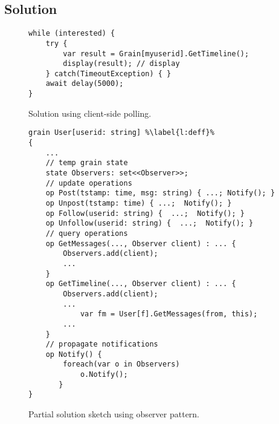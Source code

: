 \subsection{Solution}


 
\begin{figure}
\begin{lstlisting}
while (interested) {
	try {
		var result = Grain[myuserid].GetTimeline();
		display(result); // display
	} catch(TimeoutException) { }
	await delay(5000);
}
\end{lstlisting}
\caption{Solution using client-side polling.}\label{fig:chirper}
\end{figure}

\begin{figure}
\begin{lstlisting}
grain User[userid: string] %\label{l:deff}%
{
	...
	// temp grain state
	state Observers: set<<Observer>>; 
	// update operations
	op Post(tstamp: time, msg: string) { ...; Notify(); } 
	op Unpost(tstamp: time) { ...;  Notify(); }
	op Follow(userid: string) {  ...;  Notify(); }
	op Unfollow(userid: string) {  ...;  Notify(); }
	// query operations
	op GetMessages(..., Observer client) : ... { 
		Observers.add(client);
		...
	}
	op GetTimeline(..., Observer client) : ... { 
		Observers.add(client);
		...
			var fm = User[f].GetMessages(from, this);
		...		
	}
	// propagate notifications
	op Notify() {
		foreach(var o in Observers)
			o.Notify();
       }
}
\end{lstlisting}
\caption{Partial solution sketch using observer pattern.}\label{fig:chirper}
\end{figure}


